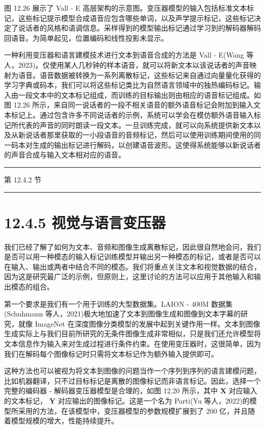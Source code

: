\documentclass[10pt]{article}
\newcommand{\HRule}{\begin{center}\rule{0.9\linewidth}{0.2mm}\end{center}}
\begin{document}
图 12.26 展示了 Vall - E 高层架构的示意图。变压器模型的输入包括标准文本标记，这些标记提示模型合成语音应包含哪些单词，以及声学提示标记，这些标记决定了说话者的风格和语调信息。采样得到的模型输出标记通过学习到的解码器解码回语音。为简单起见，位置编码和线性投影未显示。

一种利用变压器和语言建模技术进行文本到语音合成的方法是 Vall - E(Wang 等人，2023)。仅使用某人几秒钟的样本语音，就可以将新文本以该说话者的声音映射为语音。语音数据被转换为一系列离散标记，这些标记来自通过向量量化获得的学习字典或码本，我们可以将这些标记类比为自然语言领域中的独热编码标记。输入由一段文本中的文本标记组成，而训练的目标输出则由相应的语音标记组成。如图 12.26 所示，来自同一说话者的一段不相关语音的额外语音标记会附加到输入文本标记上。通过包含许多不同说话者的示例，系统可以学会在模仿额外语音输入标记所代表的声音的同时朗读一段文本。一旦训练完成，就可以向系统提供新文本以及从新说话者那里获取的一小段语音的音频标记，然后可以使用训练期间使用的同一码本对生成的输出标记进行解码，以创建语音波形。这使得系统能够以新说话者的声音合成与输入文本相对应的语音。

\HRule

第 12.4.2 节

\HRule

\section*{12.4.5 视觉与语言变压器}

我们已经了解了如何为文本、音频和图像生成离散标记，因此很自然地会问，我们是否可以用一种模态的输入标记训练模型并输出另一种模态的标记，或者是否可以在输入、输出或两者中结合不同的模态。我们将重点关注文本和视觉数据的结合，因为这是研究最广泛的示例，但原则上，这里讨论的方法可以应用于其他输入和输出模态的组合。

第一个要求是我们有一个用于训练的大型数据集。LAION - 400M 数据集(Schuhmann 等人，2021)极大地加速了文本到图像生成和图像到文本字幕的研究，就像 ImageNet 在深度图像分类模型的发展中起到关键作用一样。文本到图像生成实际上与我们目前所研究的无条件图像生成非常相似，只是我们还允许模型将文本信息作为输入来对生成过程进行条件约束。在使用变压器时，这很简单，因为我们在解码每个图像标记时只需将文本标记作为额外输入提供即可。

这种方法也可以被视为将文本到图像的问题当作一个序列到序列的语言建模问题，比如机器翻译，只不过目标标记是离散的图像标记而非语言标记。因此，选择一个完整的编码器 - 解码器变压器模型是合理的，如图 12.20 所示，其中 \(\mathbf{X}\) 对应输入的文本标记， \(\mathbf{Y}\) 对应输出的图像标记。这是一个名为 Parti(Yu 等人，2022)的模型所采用的方法，在该模型中，变压器模型的参数规模扩展到了 200 亿，并且随着模型规模的增大，性能持续提升。
\end{document}
